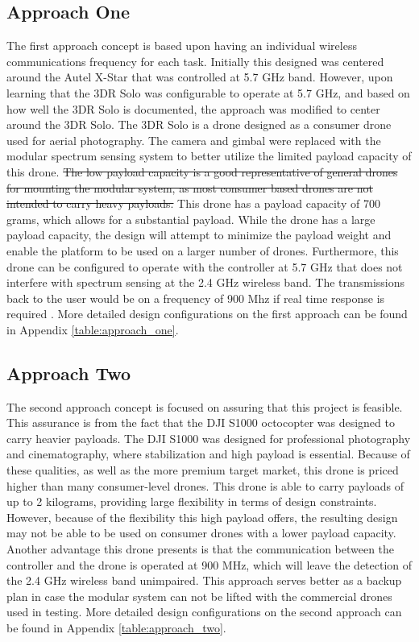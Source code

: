\subsection{Approach One}
The first approach concept is based upon having an individual wireless communications frequency for each task. Initially this designed was centered around the Autel X-Star that was controlled at 5.7 GHz band. However, upon learning that the 3DR Solo was configurable to operate at 5.7 GHz, and based on how well the 3DR Solo is documented, the approach was modified to center around the 3DR Solo. The 3DR Solo is a drone designed as a consumer drone used for aerial photography. The camera and gimbal were replaced with the modular spectrum sensing system to better utilize the limited payload capacity of this drone. \sout{The low payload capacity is a good representative of general drones for mounting the modular system, as most consumer based drones are not intended to carry heavy payloads.} This drone has a payload capacity of 700 grams, which allows for a substantial payload. While the drone has a large payload capacity, the design will attempt to minimize the payload weight and enable the platform to be used on a larger number of drones. Furthermore, this drone can be configured to operate with the controller at 5.7 GHz that does not interfere with spectrum sensing at the 2.4 GHz wireless band. The transmissions back to the user would be on a frequency of 900 Mhz if real time response is required \cite{3dr_Website}. More detailed design configurations on the first approach can be found in Appendix \ref{table:approach_one}.

\subsection{Approach Two}
The second approach concept is focused on assuring that this project is feasible. This assurance is from the fact that the DJI S1000 octocopter was designed to carry heavier payloads. The DJI S1000 was designed for professional photography and cinematography, where stabilization and high payload is essential. Because of these qualities, as well as the more premium target market, this drone is priced higher than many consumer-level drones. This drone is able to carry payloads of up to 2 kilograms, providing large flexibility in terms of design constraints. However, because of the flexibility this high payload offers, the resulting design may not be able to be used on consumer drones with a lower payload capacity. Another advantage this drone presents is that the communication between the controller and the drone is operated at 900 MHz, which will leave the detection of the 2.4 GHz wireless band unimpaired. This approach serves better as a backup plan in case the modular system can not be lifted with the commercial drones used in testing. More detailed design configurations on the second approach can be found in Appendix \ref{table:approach_two}.

